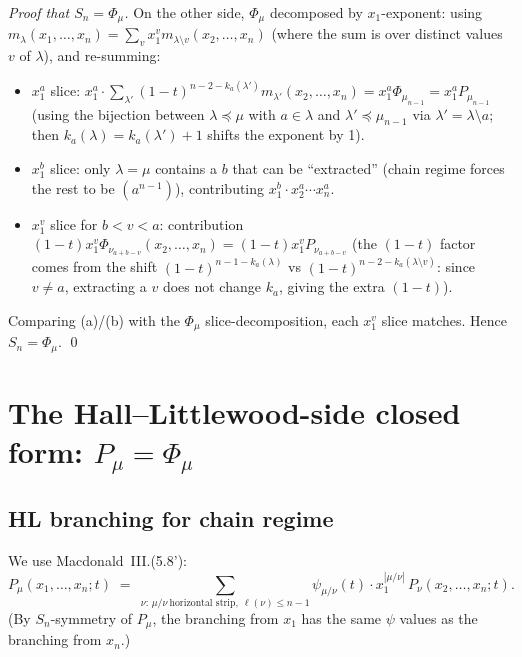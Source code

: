 \documentclass[11pt]{article}
\theoremstyle{definition}
\begin{document}
\begin{proof}[Proof that $S_n = \Phi_\mu$]
On the other side, $\Phi_\mu$ decomposed by $x_1$-exponent: using
$m_\lambda(x_1, \ldots, x_n) = \sum_v x_1^v m_{\lambda \setminus v}(x_2, \ldots, x_n)$
(where the sum is over distinct values $v$ of $\lambda$), and re-summing:
\begin{itemize}
\item $x_1^a$ slice: $x_1^a \cdot \sum_{\lambda'} (1-t)^{n-2-k_a(\lambda')} m_{\lambda'}(x_2, \ldots, x_n) = x_1^a \Phi_{\mu_{n-1}} = x_1^a P_{\mu_{n-1}}$ (using
  the bijection between $\lambda \preceq \mu$ with $a \in \lambda$ and
  $\lambda' \preceq \mu_{n-1}$ via $\lambda' = \lambda \setminus a$; then
  $k_a(\lambda) = k_a(\lambda') + 1$ shifts the exponent by 1).
\item $x_1^b$ slice: only $\lambda = \mu$ contains a $b$ that can be
  ``extracted'' (chain regime forces the rest to be $(a^{n-1})$), contributing
  $x_1^b \cdot x_2^a \cdots x_n^a$.
\item $x_1^v$ slice for $b < v < a$: contribution
  $(1-t) x_1^v \Phi_{\nu_{a+b-v}}(x_2, \ldots, x_n) = (1-t) x_1^v P_{\nu_{a+b-v}}$
  (the $(1-t)$ factor comes from the shift $(1-t)^{n-1-k_a(\lambda)}$ vs
  $(1-t)^{n-2-k_a(\lambda \setminus v)}$: since $v \ne a$, extracting a $v$
  does not change $k_a$, giving the extra $(1-t)$).
\end{itemize}

Comparing (a)/(b) with the $\Phi_\mu$ slice-decomposition, each $x_1^v$
slice matches. Hence $S_n = \Phi_\mu$. \qed
\end{proof}

\section{The Hall--Littlewood-side closed form: $P_\mu = \Phi_\mu$}\label{sec:P-closed}

\subsection{HL branching for chain regime}

We use Macdonald~III.(5.8'):
\begin{equation}\label{eq:HL-branching}
  P_\mu(x_1, \ldots, x_n; t) \;=\; \sum_{\nu:\, \mu/\nu\ \text{horizontal strip},\ \ell(\nu) \le n-1}\!\! \psi_{\mu/\nu}(t) \cdot x_1^{|\mu/\nu|}\, P_\nu(x_2, \ldots, x_n; t).
\end{equation}
(By $S_n$-symmetry of $P_\mu$, the branching from $x_1$ has the same $\psi$
values as the branching from $x_n$.)
\end{document}
